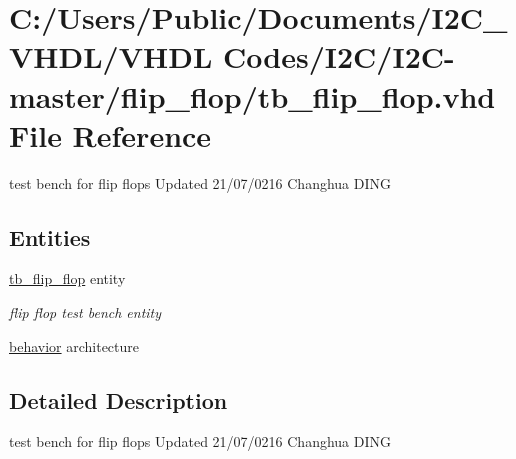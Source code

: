 \hypertarget{tb__flip__flop_8vhd}{}\section{C\+:/\+Users/\+Public/\+Documents/\+I2\+C\+\_\+\+V\+H\+D\+L/\+V\+H\+DL Codes/\+I2\+C/\+I2\+C-\/master/flip\+\_\+flop/tb\+\_\+flip\+\_\+flop.vhd File Reference}
\label{tb__flip__flop_8vhd}


test bench for flip flops Updated 21/07/0216 Changhua D\+I\+NG  


\subsection*{Entities}
\begin{DoxyCompactItemize}
\item 
\hyperlink{classtb__flip__flop}{tb\+\_\+flip\+\_\+flop} entity
\begin{DoxyCompactList}\small\item\em flip flop test bench entity \end{DoxyCompactList}\item 
\hyperlink{classtb__flip__flop_1_1behavior}{behavior} architecture
\end{DoxyCompactItemize}


\subsection{Detailed Description}
test bench for flip flops Updated 21/07/0216 Changhua D\+I\+NG 

